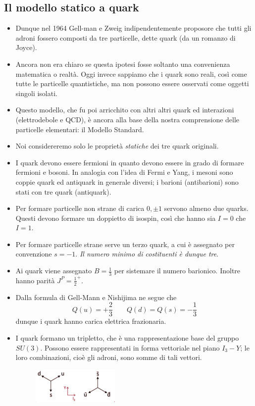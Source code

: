 \subsection{Il modello statico a quark}
\begin{itemize}
\item Dunque nel 1964 Gell-man e Zweig indipendentemente proposore che tutti gli adroni fossero composti da tre particelle, dette quark (da un romanzo di Joyce).
\item Ancora non era chiaro se questa ipotesi fosse soltanto una convenienza matematica o realtà. Oggi invece sappiamo che i quark sono reali, così come tutte le particelle quantistiche, ma non possono essere osservati come oggetti singoli isolati.
\item Questo modello, che fu poi arricchito con altri altri quark ed interazioni (elettrodebole e QCD), è ancora alla base della nostra comprensione delle particelle elementari: il Modello Standard.
\item Noi considereremo solo le proprietà \textit{statiche} dei tre quark originali.
\item I quark devono essere fermioni in quanto devono essere in grado di formare fermioni e bosoni. In analogia con l'idea di Fermi e Yang, i mesoni sono coppie quark ed antiquark in generale diversi; i barioni (antibarioni) sono stati con tre quark (antiquark).
\item Per formare particelle non strane di carica $0,\pm1$ servono almeno due quarks. Questi devono formare un doppietto di isospin, così che hanno sia $I=0$ che $I=1$.
\item Per formare particelle strane serve un terzo quark, a cui è assegnato per convenzione $s=-1$. \textit{Il numero minimo di costituenti è dunque tre}.
\item Ai quark viene assegnato $B=\frac13$ per sistemare il numero barionico. Inoltre hanno parità $J^P=\frac12^+$.
\item Dalla formula di Gell-Mann e Nishijima ne segue che 
\begin{equation*}
Q(u)=+\frac23\qquad Q(d)=Q(s)=-\frac13
\end{equation*}
dunque i quark hanno carica elettrica frazionaria.
\item I quark formano un tripletto, che è una rappresentazione base del gruppo $SU(3)$. Possono essere rappresentati in forma vettoriale nel piano $I_3-Y$; le loro combinazioni, cioè gli adroni, sono somme di tali vettori.
\begin{figure}[H]
    \centering
    \includegraphics[width=0.4\textwidth]{immagini/fig_quark_vector.png}
  \end{figure}
\end{itemize}
